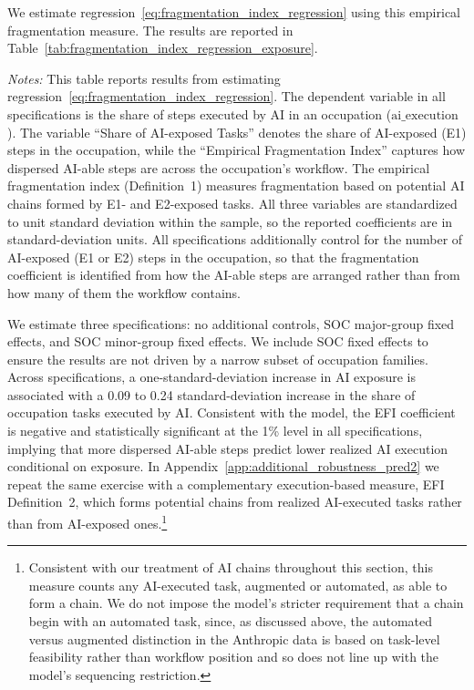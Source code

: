 We estimate regression~\eqref{eq:fragmentation_index_regression} using this empirical fragmentation measure.
The results are reported in Table~\ref{tab:fragmentation_index_regression_exposure}.
\begin{table}[t!]
    \caption{Role of AI-able Task Fragmentation in Determining AI Execution Outcomes}
    \label{tab:fragmentation_index_regression_exposure}
    \begin{center}
    
    \end{center}
    \raggedright \footnotesize{\emph{Notes:}} This table reports results from estimating regression~\eqref{eq:fragmentation_index_regression}.
    The dependent variable in all specifications is the share of steps executed by AI in an occupation ($\text{ai\_execution}$).
    The variable ``Share of AI-exposed Tasks'' denotes the share of AI-exposed (E1) steps in the occupation, while the ``Empirical Fragmentation Index'' captures how dispersed AI-able steps are across the occupation's workflow.
    The empirical fragmentation index (Definition~1) measures fragmentation based on potential AI chains formed by E1- and E2-exposed tasks.
    All three variables are standardized to unit standard deviation within the sample, so the reported coefficients are in standard-deviation units. All specifications additionally control for the number of AI-exposed (E1 or E2) steps in the occupation, so that the fragmentation coefficient is identified from how the AI-able steps are arranged rather than from how many of them the workflow contains.
\end{table}
We estimate three specifications: no additional controls, SOC major-group fixed effects, and SOC minor-group fixed effects.
We include SOC fixed effects to ensure the results are not driven by a narrow subset of occupation families.
Across specifications, a one-standard-deviation increase in AI exposure is associated with a 0.09 to 0.24 standard-deviation increase in the share of occupation tasks executed by AI.
Consistent with the model, the EFI coefficient is negative and statistically significant at the 1\% level in all specifications, implying that more dispersed AI-able steps predict lower realized AI execution conditional on exposure.
In Appendix~\ref{app:additional_robustness_pred2} we repeat the same exercise with a complementary execution-based measure, EFI Definition~2, which forms potential chains from realized AI-executed tasks rather than from AI-exposed ones.\footnote{
Consistent with our treatment of AI chains throughout this section, this measure counts any AI-executed task, augmented or automated, as able to form a chain.
We do not impose the model's stricter requirement that a chain begin with an automated task, since, as discussed above, the automated versus augmented distinction in the Anthropic data is based on task-level feasibility rather than workflow position and so does not line up with the model's sequencing restriction.
}
